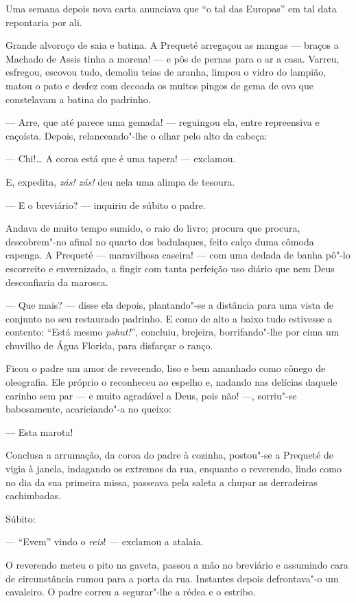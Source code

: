 Uma semana depois nova carta anunciava que ``o tal das Europas'' em tal
data repontaria por ali.

Grande alvoroço de saia e batina. A Prequeté arregaçou as mangas ---
braços a Machado de Assis tinha a morena! --- e pôs de pernas para o ar
a casa. Varreu, esfregou, escovou tudo, demoliu teias de aranha, limpou
o vidro do lampião, matou o pato e desfez com decoada os muitos pingos
de gema de ovo que constelavam a batina do padrinho.

--- Arre, que até parece uma gemada! --- reguingou ela, entre
repreensiva e caçoísta. Depois, relanceando"-lhe o olhar pelo alto da
cabeça:

--- Chi!\ldots{} A coroa está que é uma tapera! --- exclamou.

E, expedita, \emph{zás! zás!} deu nela uma alimpa de tesoura.

--- E o breviário? --- inquiriu de súbito o padre.

Andava de muito tempo sumido, o raio do livro; procura que procura,
descobrem"-no afinal no quarto dos badulaques, feito calço duma cômoda
capenga. A Prequeté --- maravilhosa caseira! --- com uma dedada de banha
pô"-lo escorreito e envernizado, a fingir com tanta perfeição uso diário
que nem Deus desconfiaria da marosca.

--- Que mais? --- disse ela depois, plantando"-se a distância para uma
vista de conjunto no seu restaurado padrinho. E como de alto a baixo
tudo estivesse a contento: ``Está mesmo \emph{pshut!}'', concluiu,
brejeira, borrifando"-lhe por cima um chuvilho de Água Florida, para
disfarçar o ranço.

Ficou o padre um amor de reverendo, liso e bem amanhado como cônego de
oleografia. Ele próprio o reconheceu ao espelho e, nadando nas delícias
daquele carinho sem par --- e muito agradável a Deus, pois não! ---,
sorriu"-se babosamente, acariciando"-a no queixo:

--- Esta marota!

Conclusa a arrumação, da coroa do padre à cozinha, postou"-se a Prequeté
de vigia à janela, indagando os extremos da rua, enquanto o reverendo,
lindo como no dia da sua primeira missa, passeava pela saleta a chupar
as derradeiras cachimbadas.

Súbito:

--- ``Evem'' vindo o \emph{reis}! --- exclamou a atalaia.

O reverendo meteu o pito na gaveta, passou a mão no breviário e
assumindo cara de circunstância rumou para a porta da rua. Instantes
depois defrontava"-o um cavaleiro. O padre correu a segurar"-lhe a rédea e
o estribo.


